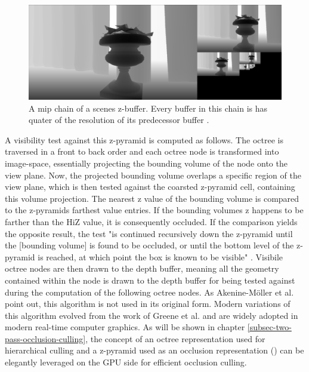 \begin{figure}[h]
    \centering
    \includegraphics[width=\linewidth]{images/graphics/hiz-mip-chain.png}
    \caption{A mip chain of a scenes z-buffer. Every buffer in this chain is has quater of the resolution of its 
    predecessor buffer \cite{Schachtschabel2017}.}
    \label{fig:hiz-mip-chain}
\end{figure}

\noindent
A visibility test against this z-pyramid is computed as follows. The octree is traversed in a front to back order 
and each octree node is transformed into image-space, essentially projecting the bounding volume of the node onto 
the view plane. Now, the projected bounding volume overlaps a specific region of the view plane, which is then 
tested against the coarsted z-pyramid cell, containing this volume projection. The nearest z value of the bounding 
volume is compared to the z-pyramids farthest value entries. If the bounding volumes z happens to be farther than the 
\ac{HiZ} value, it is consequently occluded. If the comparison yields the opposite result, the test "is continued 
recursively down the z-pyramid until the [bounding volume] is found to be occluded, or until the bottom level of the 
z-pyramid is reached, at which point the box is known to be visible" \cite{AkenineMoeller2018}. Visibile octree nodes 
are then drawn to the depth buffer, meaning all the geometry contained within the node is drawn to the depth buffer 
for being tested against during the computation of the following octree nodes. As Akenine-Möller et al. 
\cite{AkenineMoeller2018} point out, this algorithm is not used in its original form. Modern variations of this 
algorithm evolved from the work of Greene et al. \cite{Greene93} and are widely adopted in modern real-time computer 
graphics. As will be shown in chapter \ref{subsec-two-pass-occlusion-culling}, the concept of an octree representation 
used for hierarchical culling and a z-pyramid used as an occlusion representation (\cite{AkenineMoeller2018}) can be 
elegantly leveraged on the \ac{GPU} side for efficient occlusion culling.


